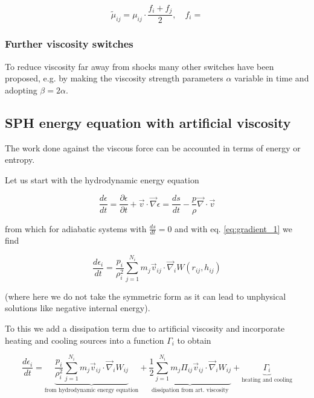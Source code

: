 \begin{equation}
    \tilde{\mu}_{ij} = \mu_{ij} \cdot \frac{f_i + f_j}{2}, \quad f_i = 
\end{equation}

\subsubsection{Further viscosity switches}
To reduce viscosity far away from shocks many other switches have been proposed,
e.g. by making the viscosity strength parameters $\alpha$ variable in time and adopting $\beta = 2 \alpha$.


\subsection{SPH energy equation with artificial viscosity}
The work done against the viscous force can be accounted in terms of energy or entropy.

Let us start with the hydrodynamic energy equation

\begin{equation}
    \frac{d \epsilon}{d t}=\frac{\partial \epsilon}{\partial t}+\vec{v} \cdot \vec{\nabla} \epsilon=\frac{d s}{d t}-\frac{p}{\rho} \vec{\nabla} \cdot \vec{v}
\end{equation}

from which for adiabatic systems with $\frac{d s}{d t}=0$ and with eq. \ref{eq:gradient_1} we find

\begin{equation}
    \frac{d \epsilon_i}{d t}=\frac{p_i}{\rho_i^2} \sum_{j=1}^{N_i} m_j \vec{v}_{i j} \cdot \vec{\nabla}_i W\left(r_{i j}, h_{i j}\right)
\end{equation}

(where here we do not take the symmetric form as it can lead to unphysical solutions like negative internal energy).

To this we add a dissipation term due to artificial viscosity and incorporate
heating and cooling sources into a function $\Gamma_i$ to obtain

\begin{equation}
    \boxed{\frac{d \epsilon_i}{d t}=\underbrace{\frac{p_i}{\rho_i^2} \sum_{j=1}^{N_i} m_j \vec{v}_{i j} \cdot \vec{\nabla}_i W_{i j}}_{\text{from hydrodynamic energy equation}}+\underbrace{\frac{1}{2} \sum_{j=1}^{N_i} m_j \Pi_{i j} \vec{v}_{i j} \cdot \vec{\nabla}_i W_{i j}}_{\text{dissipation from art. viscosity}}+\underbrace{\Gamma_i}_{\text{heating and cooling}}}
\end{equation}

